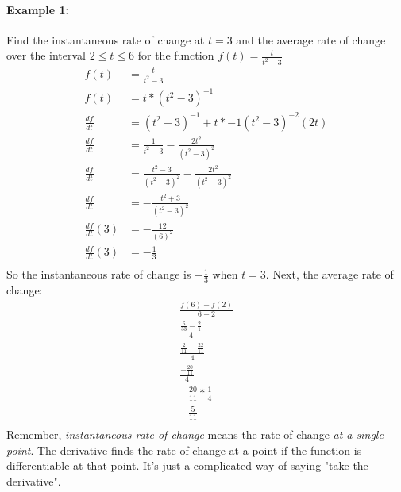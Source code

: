 \documentclass[../revisedmain.tex]{subfiles}
\begin{document}
\paragraph{Example 1:}Find the instantaneous rate of change at $t=3$ and the average rate of change over the interval $2\le t\le6$ for the function $f(t)=\displaystyle\frac{t}{t^2-3}$\\
\begin{equation}
	\begin{split}
	f(t)&=\frac{t}{t^2-3}\\
	f(t)&=t*(t^2-3)^{-1}\\
	\frac{df}{dt}&=(t^2-3)^{-1}+t*-1(t^2-3)^{-2}(2t)\\
	\frac{df}{dt}&=\frac{1}{t^2-3}-\frac{2t^2}{(t^2-3)^2}\\
	\frac{df}{dt}&=\frac{t^2-3}{(t^2-3)^2}-\frac{2t^2}{(t^2-3)^2}\\
	\frac{df}{dt}&=-\frac{t^2+3}{(t^2-3)^2}\\
	\frac{df}{dt}(3)&=-\frac{12}{(6)^2}\\
	\frac{df}{dt}(3)&=-\frac{1}{3}\\
	\end{split}
\end{equation}So the instantaneous rate of change is $-\frac{1}{3}$ when $t=3$. Next, the average rate of change:
\begin{gather*}
\frac{f(6)-f(2)}{6-2}\\[.5em]
\frac{\displaystyle\frac{6}{33}-\displaystyle\frac{2}{1}}{4}\\[.5em]
\frac{\displaystyle\frac{2}{11}-\displaystyle\frac{22}{11}}{4}\\[.5em]
\frac{-\displaystyle\frac{20}{11}}{4}\\[.5em]
-\frac{20}{11}*\frac{1}{4}\\[.5em]
-\frac{5}{11}\\
\end{gather*}Remember, \textit{instantaneous rate of change} means the rate of change \textit{at a single point}. The derivative finds the rate of change at a point if the function is differentiable at that point. It's just a complicated way of saying "take the derivative".
\end{document}
